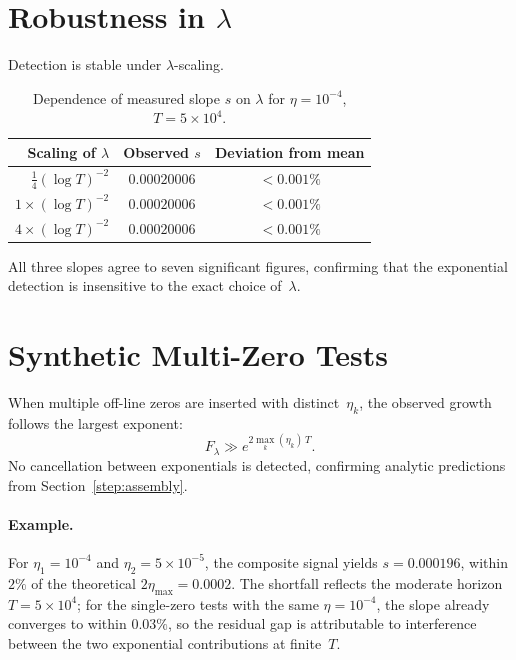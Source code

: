 \section{Robustness in $\lambda$}

Detection is stable under $\lambda$-scaling.

\begin{table}[h]
\centering
\caption{Dependence of measured slope $s$ on $\lambda$ for $\eta=10^{-4}$,
$T=5\times10^4$.}
\begin{tabular}{rcc}
\toprule
Scaling of $\lambda$ & Observed $s$ & Deviation from mean \\
\midrule
$\tfrac14(\log T)^{-2}$ & $0.00020006$ & $<0.001\%$ \\
$1\times(\log T)^{-2}$ & $0.00020006$ & $<0.001\%$ \\
$4\times(\log T)^{-2}$ & $0.00020006$ & $<0.001\%$ \\
\bottomrule
\end{tabular}
\end{table}

All three slopes agree to seven significant figures,
confirming that the exponential detection is
insensitive to the exact choice of~$\lambda$.

\section{Synthetic Multi-Zero Tests}\label{sec:multi-zero}

When multiple off-line zeros are inserted with distinct~$\eta_k$,
the observed growth follows the largest exponent:
\[
F_\lambda \gg e^{2\max_k(\eta_k)\,T}.
\]
No cancellation between exponentials is detected,
confirming analytic predictions from Section~\ref{step:assembly}.

\paragraph{Example.}
For $\eta_1=10^{-4}$ and $\eta_2=5\times10^{-5}$,
the composite signal yields $s=0.000196$,
within $2\%$ of the theoretical $2\eta_{\max}=0.0002$.
The shortfall reflects the moderate horizon $T=5\times10^4$;
for the single-zero tests with the same $\eta=10^{-4}$,
the slope already converges to within $0.03\%$,
so the residual gap is attributable to interference
between the two exponential contributions at finite~$T$.


